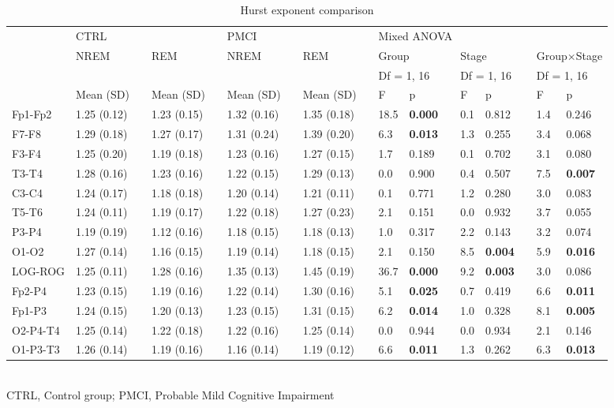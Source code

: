 \documentclass[10pt]{article}
\begin{document}
\begin{table}
\caption{Hurst exponent comparison}
\begin{small}
\begin{tabular}{lllllllllllllllll}
\toprule
 & \multicolumn{3}{l}{CTRL} & \phantom{.}  & \multicolumn{3}{l}{PMCI} & \phantom{.} & \multicolumn{8}{l}{Mixed ANOVA} \\
\cmidrule{2-4} \cmidrule{6-8} \cmidrule{10-17}
 & NREM &  & REM   & & NREM &  & REM  &  & 
   \multicolumn{2}{l}{Group} &  & \multicolumn{2}{l}{Stage} & & \multicolumn{2}{l}{Group$\times$Stage}  \\
 &&&&&&&&& \multicolumn{2}{l}{Df = 1, 16} &  &  \multicolumn{2}{l}{Df = 1, 16}  &  &  \multicolumn{2}{l}{Df = 1, 16}  \\
\cmidrule{2-2} \cmidrule{4-4} \cmidrule{6-6} \cmidrule{8-8} \cmidrule{10-11} \cmidrule{13-14} \cmidrule{16-17}    
 & Mean (SD) &  & Mean (SD) &  & Mean (SD) &  & Mean (SD) &  & F & p &  & F & p &  & F & p \\
\midrule
Fp1-Fp2&1.25 (0.12) &&1.23 (0.15) &&1.32 (0.16) &&1.35 (0.18) &&18.5&\bf 0.000&&0.1&0.812&&1.4&0.246
 \\
F7-F8&1.29 (0.18) &&1.27 (0.17) &&1.31 (0.24) &&1.39 (0.20) &&6.3&\bf 0.013&&1.3&0.255&&3.4&0.068
 \\
F3-F4&1.25 (0.20) &&1.19 (0.18) &&1.23 (0.16) &&1.27 (0.15) &&1.7&    0.189&&0.1&0.702&&3.1&0.080
 \\
T3-T4&1.28 (0.16) &&1.23 (0.16) &&1.22 (0.15) &&1.29 (0.13) &&0.0&    0.900&&0.4&0.507&&7.5&\bf 0.007
 \\
C3-C4&1.24 (0.17) &&1.18 (0.18) &&1.20 (0.14) &&1.21 (0.11) &&0.1&    0.771&&1.2&0.280&&3.0&0.083
 \\
T5-T6&1.24 (0.11) &&1.19 (0.17) &&1.22 (0.18) &&1.27 (0.23) &&2.1&    0.151&&0.0&0.932&&3.7&0.055
 \\
P3-P4&1.19 (0.19) &&1.12 (0.16) &&1.18 (0.15) &&1.18 (0.13) &&1.0&    0.317&&2.2&0.143&&3.2&0.074
 \\
O1-O2&1.27 (0.14) &&1.16 (0.15) &&1.19 (0.14) &&1.18 (0.15) &&2.1&    0.150&&8.5&\bf 0.004&&5.9&\bf 0.016
 \\
LOG-ROG&1.25 (0.11) &&1.28 (0.16) &&1.35 (0.13) &&1.45 (0.19) &&36.7&\bf 0.000&&9.2&\bf 0.003&&3.0&0.086
 \\
Fp2-P4&1.23 (0.15) &&1.19 (0.16) &&1.22 (0.14) &&1.30 (0.16) &&5.1&\bf 0.025&&0.7&0.419&&6.6&\bf 0.011
 \\
Fp1-P3&1.24 (0.15) &&1.20 (0.13) &&1.23 (0.15) &&1.31 (0.15) &&6.2&\bf 0.014&&1.0&0.328&&8.1&\bf 0.005
 \\
O2-P4-T4&1.25 (0.14) &&1.22 (0.18) &&1.22 (0.16) &&1.25 (0.14) &&0.0&0.944&&0.0&0.934&&2.1&0.146
 \\
O1-P3-T3&1.26 (0.14) &&1.19 (0.16) &&1.16 (0.14) &&1.19 (0.12) &&6.6&\bf 0.011&&1.3&0.262&&6.3&\bf 0.013
 \\
\bottomrule
\end{tabular}\\
CTRL, Control group; PMCI, Probable Mild Cognitive Impairment
\end{small}
\end{table}
\end{document}
